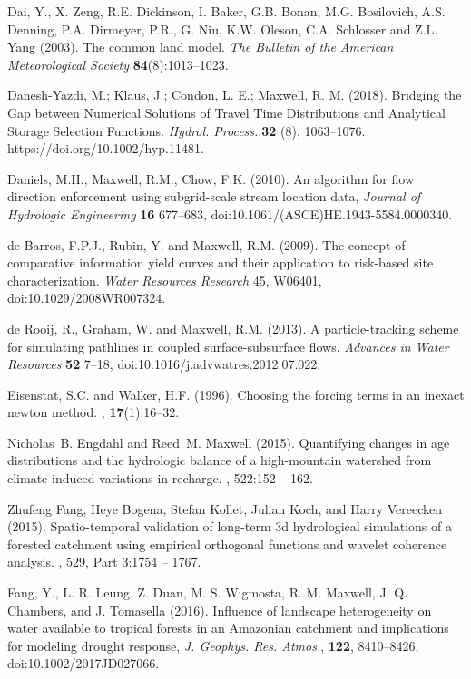 \begin{thebibliography}{999}
Dai, Y., X. Zeng, R.E. Dickinson, I. Baker, G.B. Bonan, M.G. Bosilovich, A.S. Denning, P.A. Dirmeyer, P.R., G. Niu, K.W. Oleson, C.A. Schlosser and Z.L. Yang (2003). The common land model. {\em The Bulletin of the American Meteorological Society} {\bf 84}(8):1013--1023.

Danesh-Yazdi, M.; Klaus, J.; Condon, L. E.; Maxwell, R. M. (2018). Bridging the Gap between Numerical Solutions of Travel Time Distributions and Analytical Storage Selection Functions. {\em Hydrol. Process.}.{\bf 32} (8), 1063–1076. https://doi.org/10.1002/hyp.11481.

Daniels, M.H., Maxwell, R.M., Chow, F.K. (2010). An algorithm for flow direction enforcement using subgrid-scale stream location data, {\em Journal of Hydrologic Engineering} {\bf 16} 677--683, doi:10.1061/(ASCE)HE.1943-5584.0000340.

de Barros, F.P.J., Rubin, Y. and Maxwell, R.M. (2009). The concept of comparative information yield curves and their application to risk-based site characterization. {\em Water Resources Research} 45, W06401, doi:10.1029/2008WR007324.

de Rooij, R., Graham, W. and Maxwell, R.M. (2013). A particle-tracking scheme for simulating pathlines in coupled surface-subsurface flows. {\em Advances in Water Resources} {\bf 52} 7--18, doi:10.1016/j.advwatres.2012.07.022.

Eisenstat, S.C. and Walker, H.F. (1996).
\newblock Choosing the forcing terms in an inexact newton method.
, {\bf 17}(1):16--32.

	Nicholas~B. Engdahl and Reed~M. Maxwell (2015).
\newblock Quantifying changes in age distributions and the hydrologic balance
  of a high-mountain watershed from climate induced variations in recharge.
, 522:152 -- 162.

	Zhufeng Fang, Heye Bogena, Stefan Kollet, Julian Koch, and Harry Vereecken (2015).
\newblock Spatio-temporal validation of long-term 3d hydrological simulations
  of a forested catchment using empirical orthogonal functions and wavelet
  coherence analysis.
, 529, Part 3:1754 -- 1767.

Fang, Y., L. R. Leung, Z. Duan, M. S. Wigmosta, R. M. Maxwell, J. Q. Chambers, and J. Tomasella (2016). Influence of landscape heterogeneity on water available to tropical forests in an Amazonian catchment and implications for modeling drought response, {\em J. Geophys. Res. Atmos.}, {\bf 122}, 8410–8426, doi:10.1002/2017JD027066.



\end{thebibliography}
